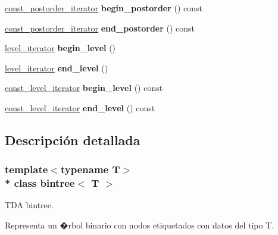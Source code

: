 \begin{DoxyCompactItemize}
\item 
\hyperlink{classbintree_1_1const__postorder__iterator}{const\+\_\+postorder\+\_\+iterator} {\bfseries begin\+\_\+postorder} () const \hypertarget{classbintree_abd8fb69e96f1326b8d1745ccd1833352}{}\label{classbintree_abd8fb69e96f1326b8d1745ccd1833352}

\item 
\hyperlink{classbintree_1_1const__postorder__iterator}{const\+\_\+postorder\+\_\+iterator} {\bfseries end\+\_\+postorder} () const \hypertarget{classbintree_a1d07a09dcecab8ac31ac5978166849d3}{}\label{classbintree_a1d07a09dcecab8ac31ac5978166849d3}

\item 
\hyperlink{classbintree_1_1level__iterator}{level\+\_\+iterator} {\bfseries begin\+\_\+level} ()\hypertarget{classbintree_ab806982263f4c480797e3addb07d9724}{}\label{classbintree_ab806982263f4c480797e3addb07d9724}

\item 
\hyperlink{classbintree_1_1level__iterator}{level\+\_\+iterator} {\bfseries end\+\_\+level} ()\hypertarget{classbintree_a510c30fe888aa44af32ebeeacf61e495}{}\label{classbintree_a510c30fe888aa44af32ebeeacf61e495}

\item 
\hyperlink{classbintree_1_1const__level__iterator}{const\+\_\+level\+\_\+iterator} {\bfseries begin\+\_\+level} () const \hypertarget{classbintree_a294c19f33a55a82e0a535a8a3cc9eb0a}{}\label{classbintree_a294c19f33a55a82e0a535a8a3cc9eb0a}

\item 
\hyperlink{classbintree_1_1const__level__iterator}{const\+\_\+level\+\_\+iterator} {\bfseries end\+\_\+level} () const \hypertarget{classbintree_adb0cc4036c25955ed92dd421af03001b}{}\label{classbintree_adb0cc4036c25955ed92dd421af03001b}

\end{DoxyCompactItemize}


\subsection{Descripción detallada}
\subsubsection*{template$<$typename T$>$\\*
class bintree$<$ T $>$}

T\+DA bintree.

Representa un �rbol binario con nodos etiquetados con datos del tipo T.

